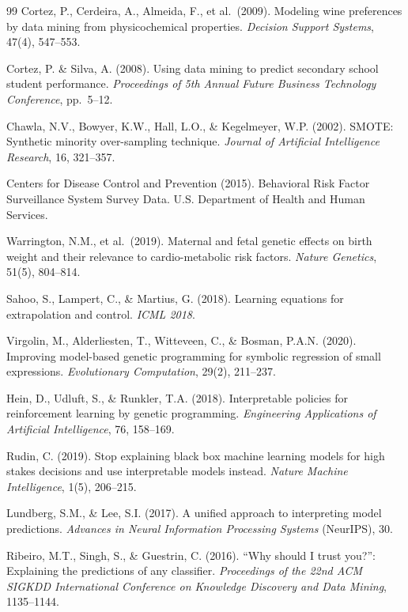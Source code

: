 \documentclass[10pt,twocolumn]{article}
\begin{document}
\begin{thebibliography}{99}
Cortez, P., Cerdeira, A., Almeida, F., et al.\ (2009).
Modeling wine preferences by data mining from physicochemical properties.
\textit{Decision Support Systems}, 47(4), 547--553.

Cortez, P. \& Silva, A. (2008).
Using data mining to predict secondary school student performance.
\textit{Proceedings of 5th Annual Future Business Technology Conference},
pp.\ 5--12.

Chawla, N.V., Bowyer, K.W., Hall, L.O., \& Kegelmeyer, W.P. (2002).
SMOTE: Synthetic minority over-sampling technique.
\textit{Journal of Artificial Intelligence Research}, 16, 321--357.

Centers for Disease Control and Prevention (2015).
Behavioral Risk Factor Surveillance System Survey Data.
U.S. Department of Health and Human Services.

Warrington, N.M., et al.\ (2019).
Maternal and fetal genetic effects on birth weight and their relevance to
cardio-metabolic risk factors.
\textit{Nature Genetics}, 51(5), 804--814.

Sahoo, S., Lampert, C., \& Martius, G. (2018).
Learning equations for extrapolation and control.
\textit{ICML 2018}.

Virgolin, M., Alderliesten, T., Witteveen, C., \& Bosman, P.A.N. (2020).
Improving model-based genetic programming for symbolic regression of small
expressions.
\textit{Evolutionary Computation}, 29(2), 211--237.

Hein, D., Udluft, S., \& Runkler, T.A. (2018).
Interpretable policies for reinforcement learning by genetic programming.
\textit{Engineering Applications of Artificial Intelligence}, 76, 158--169.

Rudin, C. (2019).
Stop explaining black box machine learning models for high stakes decisions
and use interpretable models instead.
\textit{Nature Machine Intelligence}, 1(5), 206--215.

Lundberg, S.M., \& Lee, S.I. (2017).
A unified approach to interpreting model predictions.
\textit{Advances in Neural Information Processing Systems} (NeurIPS), 30.

Ribeiro, M.T., Singh, S., \& Guestrin, C. (2016).
``Why should I trust you?'': Explaining the predictions of any classifier.
\textit{Proceedings of the 22nd ACM SIGKDD International Conference on
Knowledge Discovery and Data Mining}, 1135--1144.


\end{thebibliography}
\end{document}
